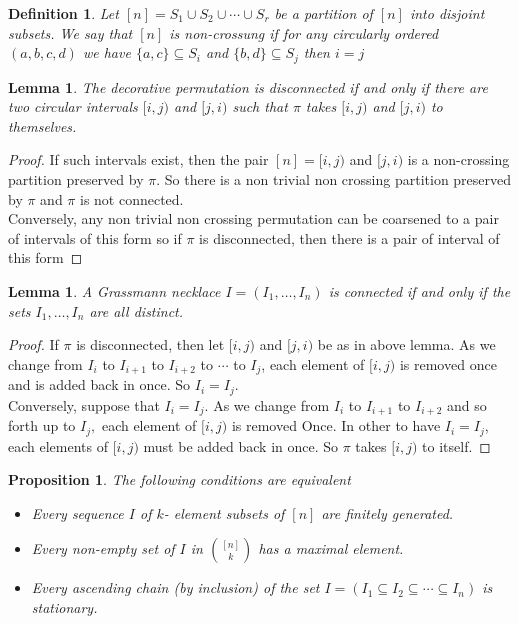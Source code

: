\documentclass[12pt]{report}
\theoremstyle{theorem}
\newtheorem{definition}[theorem]{Definition}
\newtheorem{lemma}[theorem]{Lemma}
\newtheorem{proposition}[theorem]{Proposition}
\begin{document}
\begin{definition}
\normalfont Let $[n] = S_1\cup S_2\cup \cdots \cup S_r$ be a partition of $[n]$ into disjoint subsets. We say that $[n]$ is non-crossung if for any circularly ordered $(a,b,c,d)$ we have $\{a,c\}\subseteq S_i$ and $\{b,d\}\subseteq S_j$ then $i = j$
\end{definition}

\begin{lemma}
The decorative permutation is disconnected if and only if there are two circular intervals $[i,j)$ and $[j,i)$ such that $\pi$ takes $[i,j)$ and $[j,i)$ to themselves.
\end{lemma}
\begin{proof}
If such intervals exist, then the pair $[n] = [i,j)$ and $[j,i)$ is a non-crossing partition preserved by $\pi$. So there is a non trivial non crossing partition preserved by $\pi$ and $\pi$ is not connected.\\
Conversely, any non trivial non crossing permutation can be coarsened to a pair of intervals of this form so if $\pi$ is disconnected, then there is a pair of interval of this form
\end{proof}

\begin{lemma}
A Grassmann necklace $I = (I_1,\ldots,I_n)$ is connected if and only if the sets $I_1,\ldots,I_n$ are all distinct.
\end{lemma}
\begin{proof}
If $\pi$ is disconnected, then let $[i,j)$ and $[j,i)$ be as in above lemma. As we change from $I_i$ to $I_{i+1}$ to $I_{i+2}$ to $\cdots$ to $I_j$, each element of $[i,j)$ is removed once and is added back in once. So $I_i = I_j$.\\
Conversely, suppose that $I_i = I_j$. As we change from $I_i$ to $I_{i+1}$ to $I_{i+2}$ and so forth up to $I_j,$ each element of $[i,j)$ is removed Once. In other to have $I_i = I_j$, each elements of $[i,j)$ must be added back in once. So $\pi$ takes $[i,j)$ to itself.
\end{proof}
\begin{proposition}
\normalfont The following conditions are equivalent
\begin{itemize}
	\item[(i)] Every sequence $I$ of $k$- element subsets of $[n]$ are finitely generated.
	\item[(ii)] Every non-empty set of $I$ in $\binom{[n]}{k}$ has a maximal element.
	\item[(iii)] Every ascending chain (by inclusion) of the set $I = (I_1\subseteq I_2\subseteq \cdots \subseteq I_n)$ is stationary.
\end{itemize}
\end{proposition}
\end{document}
